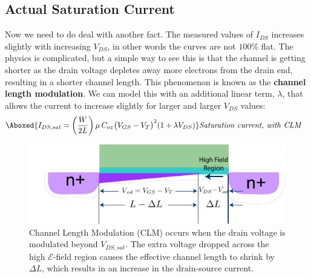 \subsection{Actual Saturation Current}
Now we need to do deal with another fact.  The measured values of  $I_{DS}$ increases slightly with increasing $V_{DS}$, in other words the curves are not $100\%$ flat.   The physics is complicated, but a simple way to see this is that the channel is getting shorter as the drain voltage depletes away more electrons from the drain end, resulting in a shorter channel length.  This phenomenon is known as the \textbf{channel length modulation}.  We can model this with an additional linear term, $\lambda$, that allows the current to increase slightly for larger and larger $V_{DS}$ values:
    \begin{align}
        \Aboxed{ I_{DS,sat} = \left( \frac{W}{2L} \right) \mu\,C_{ox} {\big(V_{GS} - V_T\big)}^2 (1 + \lambda V_{DS}) } &\textit{Saturation current, with CLM}
        \label{eq:drain_current_clm}
    \end{align}
\newpage
\begin{figure}[t]
\centering
\includegraphics[width=\columnwidth]{mos_current_sat_clm}
\caption{Channel Length Modulation (CLM) occurs when the drain voltage is modulated beyond $V_{DS,sat}$.  The extra voltage dropped across the high $\mathcal{E}$-field region causes the effective channel length to shrink by $\Delta L$, which results in an increase in the drain-source current.}
\label{fig:mos_current_sat_clm}
\end{figure}
